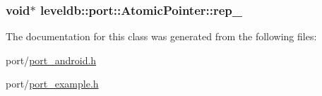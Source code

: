 \subsubsection[{rep\+\_\+}]{\setlength{\rightskip}{0pt plus 5cm}void$\ast$ leveldb\+::port\+::\+Atomic\+Pointer\+::rep\+\_\+\hspace{0.3cm}{\ttfamily [private]}}\label{classleveldb_1_1port_1_1_atomic_pointer_a0c361771aa542cece902c4b5d2a9466a}


The documentation for this class was generated from the following files\+:\begin{DoxyCompactItemize}
\item 
port/\hyperlink{port__android_8h}{port\+\_\+android.\+h}\item 
port/\hyperlink{port__example_8h}{port\+\_\+example.\+h}\end{DoxyCompactItemize}
